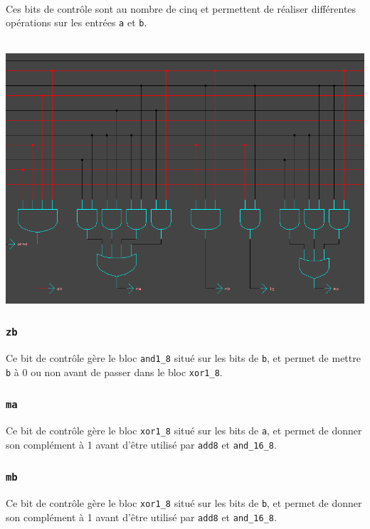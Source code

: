\documentclass[11pt, a4paper, twoside, titlepage]{article}
\begin{document}
\paragraph{}
Ces bits de contrôle sont au nombre de cinq et permettent de réaliser différentes opérations sur les entrées \texttt{a} et \texttt{b}.\\
\\
\centerline{\includegraphics[width=.8 \textwidth]{log_alu}}
\paragraph{}
\subsubsection{\texttt{zb}}
Ce bit de contrôle gère le bloc \texttt{and1\_8} situé sur les bits de \texttt{b}, et permet de mettre \texttt{b} à 0 ou non avant de passer dans le bloc \texttt{xor1\_8}.

\subsubsection{\texttt{ma}}
Ce bit de contrôle gère le bloc \texttt{xor1\_8} situé sur les bits de \texttt{a}, et permet de donner son complément à 1 avant d'être utilisé par \texttt{add8} et \texttt{and\_16\_8}.

\subsubsection{\texttt{mb}}
Ce bit de contrôle gère le bloc \texttt{xor1\_8} situé sur les bits de \texttt{b}, et permet de donner son complément à 1 avant d'être utilisé par \texttt{add8} et \texttt{and\_16\_8}.
\end{document}

